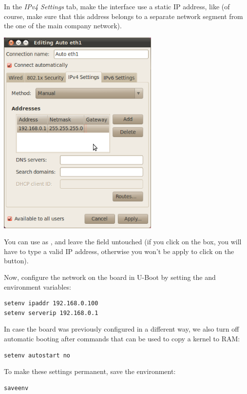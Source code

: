 In the {\em IPv4 Settings} tab, make the interface use a static IP
address, like  (of course, make sure that this
address belongs to a separate network segment from the one of the main
company network).

\begin{center}
\includegraphics[width=8cm]{labs/sysdev-u-boot/network-config-3.png}
\end{center}

You can use  as , and leave the
 field untouched (if you click on the  box, you
will have to type a valid IP address, otherwise you won't be apply to
click on the  button).

Now, configure the network on the board in U-Boot by setting the 
and  environment variables:

\begin{verbatim}
setenv ipaddr 192.168.0.100
setenv serverip 192.168.0.1
\end{verbatim}

In case the board was previously configured in a different way, we
also turn off automatic booting after commands that can be used to
copy a kernel to RAM:

\begin{verbatim}
setenv autostart no
\end{verbatim}

To make these settings permanent, save the environment:

\begin{verbatim}
saveenv
\end{verbatim}

